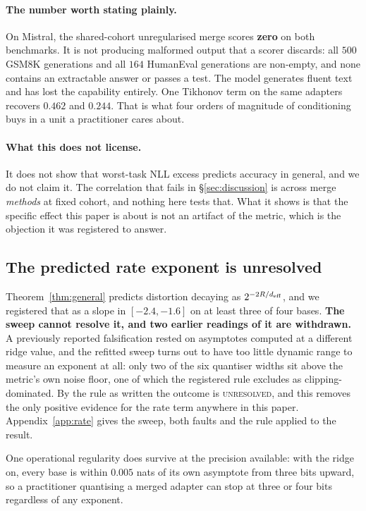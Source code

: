\paragraph{The number worth stating plainly.} On Mistral, the shared-cohort
unregularised merge scores \textbf{zero} on both benchmarks. It is not
producing malformed output that a scorer discards: all $500$ GSM8K generations
and all $164$ HumanEval generations are non-empty, and none contains an
extractable answer or passes a test. The model generates fluent text and has
lost the capability entirely. One Tikhonov term on the same adapters recovers
$0.462$ and $0.244$. That is what four orders of magnitude of conditioning buys
in a unit a practitioner cares about.

\paragraph{What this does not license.} It does not show that worst-task NLL
excess predicts accuracy in general, and we do not claim it. The correlation
that fails in \S\ref{sec:discussion} is across merge \emph{methods} at fixed
cohort, and nothing here tests that. What it shows is that the specific effect
this paper is about is not an artifact of the metric, which is the objection it
was registered to answer.

\subsection{The predicted rate exponent is unresolved}
\label{subsec:w3}

Theorem~\ref{thm:general} predicts distortion decaying as $2^{-2R/d_{\mathrm{eff}}}$,
and we registered that as a slope in $[-2.4, -1.6]$ on at least three of
four bases. \textbf{The sweep cannot resolve it, and two earlier readings
of it are withdrawn.} A previously reported falsification rested on
asymptotes computed at a different ridge value, and the refitted sweep
turns out to have too little dynamic range to measure an exponent at all:
only two of the six quantiser widths sit above the metric's own noise
floor, one of which the registered rule excludes as clipping-dominated.
By the rule as written the outcome is \textsc{unresolved}, and this
removes the only positive evidence for the rate term anywhere in this
paper. Appendix~\ref{app:rate} gives the sweep, both faults and the rule
applied to the result.

One operational regularity does survive at the precision available: with
the ridge on, every base is within $0.005$ nats of its own asymptote from
three bits upward, so a practitioner quantising a merged adapter can stop
at three or four bits regardless of any exponent.

